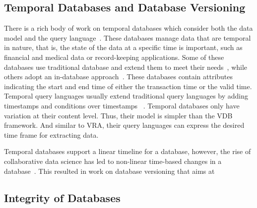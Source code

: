 \subsection{Temporal Databases and Database Versioning}
\label{sec:db-ver}

There is a rich body of work on temporal databases which consider both the data model and the query language~\cite{tempDataMng, tempDBSurv, tempDBbook}.
These databases manage data that are temporal in nature, that is, the state of the data at a specific
time is important, such as financial and medical data or record-keeping applications. 
%
Some of these databases use traditional database and extend them to meet their 
needs~\cite{stratum,Teradata, db2}, while others adopt an in-database 
approach~\cite{KaufmannMVFKFM13sigmod}.
%
These databases contain attributes indicating the start and end time of either 
the transaction time or the valid time. Temporal query languages usually extend 
traditional query languages by adding timestamps and conditions over 
timestamps ~\cite{chomicki95,Jensen2009,evalTempLang}.
%
Temporal databases only have variation at their content level. Thus, their model is simpler 
than the VDB framework. And similar to VRA, their query languages can express
the desired time frame for extracting data. 


Temporal databases support a linear timeline for a database, however, the rise of collaborative data 
science has led to non-linear time-based changes in a database~\cite{datahub15cidr}. 
This resulted in work on database versioning that aims at 

%
%

\subsection{Integrity of Databases}
\label{sec:integ}



